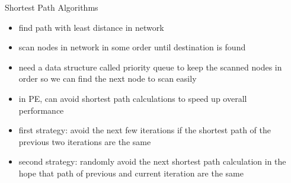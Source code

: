 \documentclass[final]{beamer}
\begin{document}
\begin{frame}{ }
\begin{columns}[t]
\begin{column}{.28\linewidth}
            \begin{block}{Shortest Path Algorithms}
                \begin{itemize}
                    \item find path with least distance in network
                    \item scan nodes in network in some order until destination is found
                    \item need a data structure called \alert{priority queue} to keep the scanned nodes in order so we can find the next node to scan easily
                \end{itemize}
                \begin{itemize}
                    \item in PE, can avoid shortest path calculations to speed up overall performance
                    \item first strategy: avoid the next few iterations if the shortest path of the previous two iterations are the same
                    \item second strategy: randomly avoid the next shortest path calculation in the hope that path of previous and current iteration are the same
                \end{itemize}
            \end{block}

        \end{column}
        \begin{column}{.4\linewidth}


\end{column}
\end{columns}
\end{frame}
\end{document}
